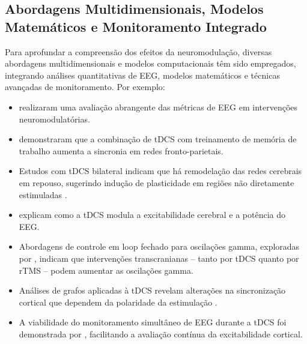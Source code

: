 \subsection{Abordagens Multidimensionais, Modelos Matemáticos e Monitoramento Integrado}
Para aprofundar a compreensão dos efeitos da neuromodulação, diversas abordagens multidimensionais e modelos computacionais têm sido empregados, integrando análises quantitativas de EEG, modelos matemáticos e técnicas avançadas de monitoramento. Por exemplo:
\begin{itemize}
    \item {} realizaram uma avaliação abrangente das métricas de EEG em intervenções neuromodulatórias.
    \item {} demonstraram que a combinação de tDCS com treinamento de memória de trabalho aumenta a sincronia em redes fronto-parietais.
    \item Estudos com tDCS bilateral indicam que há remodelação das redes cerebrais em repouso, sugerindo indução de plasticidade em regiões não diretamente estimuladas \cite{pellegrino2018bilateral}.
    \item {} explicam como a tDCS modula a excitabilidade cerebral e a potência do EEG.
    \item Abordagens de controle em loop fechado para oscilações gamma, exploradas por , indicam que intervenções transcranianas – tanto por tDCS quanto por rTMS – podem aumentar as oscilações gamma.
    \item Análises de grafos aplicadas à tDCS revelam alterações na sincronização cortical que dependem da polaridade da estimulação \cite{mancini2016assessing, pellegrino2019transcranial, schollmann2019anodal}.
    \item A viabilidade do monitoramento simultâneo de EEG durante a tDCS foi demonstrada por , facilitando a avaliação contínua da excitabilidade cortical.
\end{itemize}

